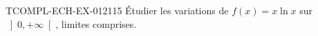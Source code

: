 \begin{exercice}{TCOMPL-ECH-EX-012}{1}{15}
Étudier les variations de $f(x) = x\ln x$ sur $\left]0, +\infty\right[$, limites comprises.

\end{exercice}
